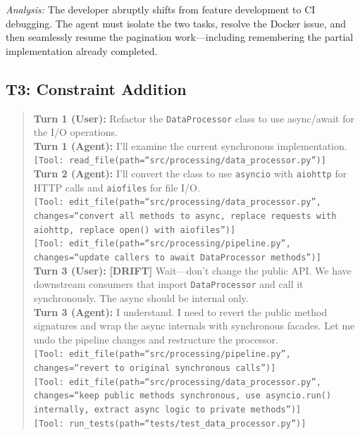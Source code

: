 \noindent\textit{Analysis:} The developer abruptly shifts from feature development to CI debugging. The agent must isolate the two tasks, resolve the Docker issue, and then seamlessly resume the pagination work---including remembering the partial implementation already completed.

\subsection{T3: Constraint Addition}

\begin{quote}
\small
\textbf{Turn 1 (User):} Refactor the \texttt{DataProcessor} class to use async/await for the I/O operations.\\
\textbf{Turn 1 (Agent):} I'll examine the current synchronous implementation.\\
\texttt{[Tool: read\_file(path=``src/processing/data\_processor.py'')]}\\[4pt]
\textbf{Turn 2 (Agent):} I'll convert the class to use \texttt{asyncio} with \texttt{aiohttp} for HTTP calls and \texttt{aiofiles} for file I/O.\\
\texttt{[Tool: edit\_file(path=``src/processing/data\_processor.py'', changes=``convert all methods to async, replace requests with aiohttp, replace open() with aiofiles'')]}\\
\texttt{[Tool: edit\_file(path=``src/processing/pipeline.py'', changes=``update callers to await DataProcessor methods'')]}\\[4pt]
\textbf{Turn 3 (User):} \textbf{[DRIFT]} Wait---don't change the public API. We have downstream consumers that import \texttt{DataProcessor} and call it synchronously. The async should be internal only.\\[4pt]
\textbf{Turn 3 (Agent):} I understand. I need to revert the public method signatures and wrap the async internals with synchronous facades. Let me undo the pipeline changes and restructure the processor.\\
\texttt{[Tool: edit\_file(path=``src/processing/pipeline.py'', changes=``revert to original synchronous calls'')]}\\
\texttt{[Tool: edit\_file(path=``src/processing/data\_processor.py'', changes=``keep public methods synchronous, use asyncio.run() internally, extract async logic to private methods'')]}\\
\texttt{[Tool: run\_tests(path=``tests/test\_data\_processor.py'')]}
\end{quote}

